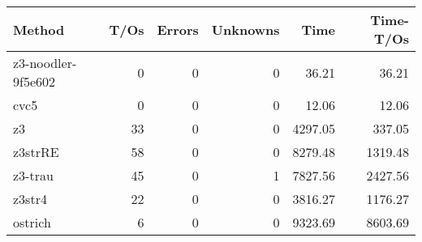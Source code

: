 \begin{tabular}{lrrrrr}
\hline
 Method             &   T/Os &   Errors &   Unknowns &    Time &   Time-T/Os \\
\hline
 z3-noodler-9f5e602 &      0 &        0 &          0 &   36.21 &       36.21 \\
 cvc5               &      0 &        0 &          0 &   12.06 &       12.06 \\
 z3                 &     33 &        0 &          0 & 4297.05 &      337.05 \\
 z3strRE            &     58 &        0 &          0 & 8279.48 &     1319.48 \\
 z3-trau            &     45 &        0 &          1 & 7827.56 &     2427.56 \\
 z3str4             &     22 &        0 &          0 & 3816.27 &     1176.27 \\
 ostrich            &      6 &        0 &          0 & 9323.69 &     8603.69 \\
\hline
\end{tabular}

